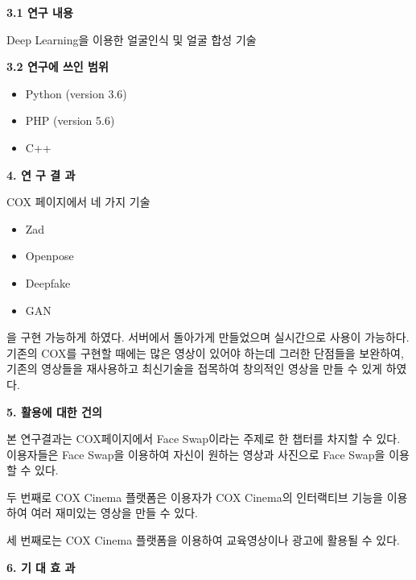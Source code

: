 \documentclass[chapter,oneside]{oblivoir}
\begin{document}
{ \large\textbf{3.1 연구 내용}  \par}

\vspace{0.5cm}

Deep Learning을 이용한 얼굴인식 및 얼굴 합성 기술

\vspace{0.5cm}

{\large\textbf{3.2 연구에 쓰인 범위}  \par}

\begin{itemize}
   \item  Python (version 3.6) 
   \item PHP (version 5.6) 
   \item C++    
\end{itemize}


{\Large\textbf{ 4. 연  구  결  과}  \par}

\vspace{0.5cm}

COX 페이지에서 네 가지 기술
\begin{itemize}
    \item Zad
    \item Openpose
    \item Deepfake
    \item GAN
\end{itemize}
을 구현 가능하게 하였다. 서버에서 돌아가게 만들었으며 실시간으로 사용이 가능하다. 기존의 COX를 구현할 때에는 많은 영상이 있어야 하는데 그러한 단점들을 보완하여, 기존의 영상들을 재사용하고 최신기술을 접목하여 창의적인 영상을 만들 수 있게 하였다.

\vspace{1cm}

{\Large\textbf{ 5. 활용에 대한 건의}  \par}
\vspace{0.5cm}

본 연구결과는 COX페이지에서 Face Swap이라는 주제로 한 챕터를 차지할 수 있다. 이용자들은 Face Swap을 이용하여 자신이 원하는 영상과 사진으로 Face Swap을 이용할 수 있다.

두 번째로 COX Cinema 플랫폼은 이용자가 COX Cinema의 인터랙티브 기능을 이용하여 여러 재미있는 영상을 만들 수 있다. 

세 번째로는 COX Cinema 플랫폼을 이용하여 교육영상이나 광고에 활용될 수 있다.


\vspace{1cm}
{\Large\textbf{ 6. 기  대  효  과} \par}
\end{document}
